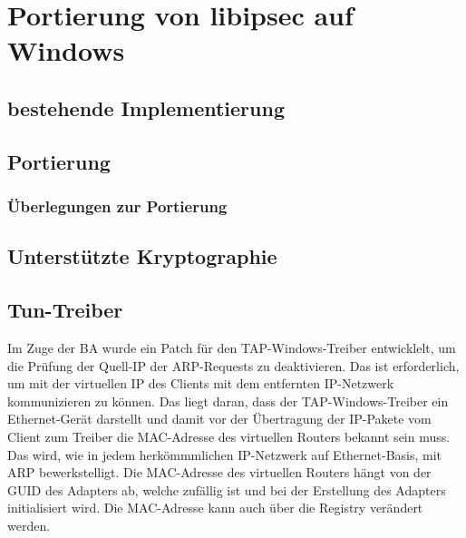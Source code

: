 


\section{Portierung von libipsec auf Windows}
\subsection{bestehende Implementierung}
\subsection{Portierung}
\subsubsection{Überlegungen zur Portierung}
\subsubsection{}
\subsection{Unterstützte Kryptographie}
\subsection{Tun-Treiber}
Im Zuge der \ac{BA} wurde ein Patch für den TAP-Windows-Treiber entwicklelt, um die
Prüfung der Quell-IP der ARP-Requests zu deaktivieren. Das ist erforderlich, um mit der
virtuellen IP des Clients mit dem entfernten IP-Netzwerk kommunizieren zu können.
Das liegt daran, dass der TAP-Windows-Treiber ein Ethernet-Gerät darstellt und damit
vor der Übertragung der IP-Pakete vom Client zum Treiber die MAC-Adresse des virtuellen Routers bekannt sein muss.
Das wird, wie in jedem herkömmmlichen IP-Netzwerk auf Ethernet-Basis, mit ARP bewerkstelligt.
Die MAC-Adresse des virtuellen Routers hängt von der GUID des Adapters ab, welche zufällig ist
und bei der Erstellung des Adapters initialisiert wird. Die MAC-Adresse kann auch über die Registry verändert werden.
